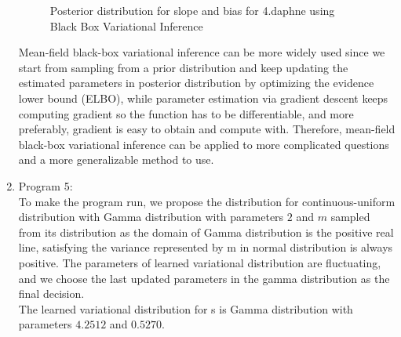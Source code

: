 \documentclass{article}
\begin{document}
\begin{enumerate}
\begin{figure}[!htp] 
    \centering
    \hfill%
        \caption{Posterior distribution for slope and bias for 4.daphne using Black Box Variational Inference}
\end{figure}

\newpage
Mean-field black-box variational inference can be more widely used since we start from sampling from a prior distribution and keep updating the estimated parameters in posterior distribution by optimizing the evidence lower bound (ELBO),  while parameter estimation via gradient descent keeps computing gradient so the function has to be differentiable, and more preferably,  gradient is easy to obtain and compute with.  Therefore,  mean-field black-box variational inference can be applied to more complicated questions and a more generalizable method to use. 


\item Program 5:\\
To make the program run, we propose the distribution for continuous-uniform distribution with Gamma distribution with parameters $2$ and $m$ sampled from its distribution as the domain of Gamma distribution is the positive real line, satisfying the variance represented by m in normal distribution is always positive.  The parameters of learned variational distribution are fluctuating,  and we choose the last updated parameters in the gamma distribution as the final decision.\\
The learned variational distribution for s is Gamma distribution with parameters $4.2512$ and $0.5270$.


\end{enumerate}
\end{document}
